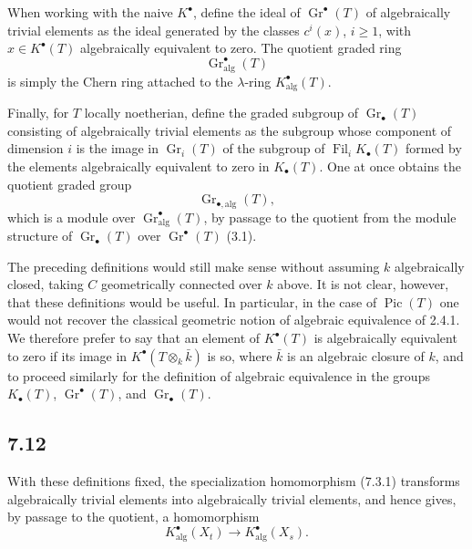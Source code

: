 \documentclass[11pt]{article}
\newcommand{\Gr}{\operatorname{Gr}}
\providecommand{\Pic}{\operatorname{Pic}}
\providecommand{\Gr}{\operatorname{Gr}}
\providecommand{\Gr}{\operatorname{G}}
\begin{document}
When working with the naive \(K^\bullet\), define the ideal of \(\Gr^\bullet(T)\) of algebraically trivial elements as the ideal generated by the classes \(c^i(x)\), \(i\geq1\), with \(x\in K^\bullet(T)\) algebraically equivalent to zero. The quotient graded ring
\begin{equation}\tag{7.11.4}
  \Gr^\bullet_{\mathrm{alg}}(T)
\end{equation}
is simply the Chern ring attached to the \(\lambda\)-ring \(K^\bullet_{\mathrm{alg}}(T)\).

Finally, for \(T\) locally noetherian, define the graded subgroup of \(\Gr_\bullet(T)\) consisting of algebraically trivial elements as the subgroup whose component of dimension \(i\) is the image in \(\Gr_i(T)\) of the subgroup of \(\operatorname{Fil}_iK_\bullet(T)\) formed by the elements algebraically equivalent to zero in \(K_\bullet(T)\). One at once obtains the quotient graded group
\begin{equation}\tag{7.11.5}
  \Gr_{\bullet,\mathrm{alg}}(T),
\end{equation}
which is a module over \(\Gr^\bullet_{\mathrm{alg}}(T)\), by passage to the quotient from the module structure of \(\Gr_\bullet(T)\) over \(\Gr^\bullet(T)\) (3.1).

The preceding definitions would still make sense without assuming \(k\) algebraically closed, taking \(C\) geometrically connected over \(k\) above. It is not clear, however, that these definitions would be useful. In particular, in the case of \(\Pic(T)\) one would not recover the classical geometric notion of algebraic equivalence of 2.4.1. We therefore prefer to say that an element of \(K^\bullet(T)\) is algebraically equivalent to zero if its image in \(K^\bullet(T\otimes_k\bar k)\) is so, where \(\bar k\) is an algebraic closure of \(k\), and to proceed similarly for the definition of algebraic equivalence in the groups \(K_\bullet(T)\), \(\Gr^\bullet(T)\), and \(\Gr_\bullet(T)\).

\subsection*{7.12}
With these definitions fixed, the specialization homomorphism (7.3.1) transforms algebraically trivial elements into algebraically trivial elements, and hence gives, by passage to the quotient, a homomorphism
\begin{equation}\tag{7.12.1}
  K^\bullet_{\mathrm{alg}}(X_t)\longrightarrow K^\bullet_{\mathrm{alg}}(X_s).
\end{equation}
\end{document}
